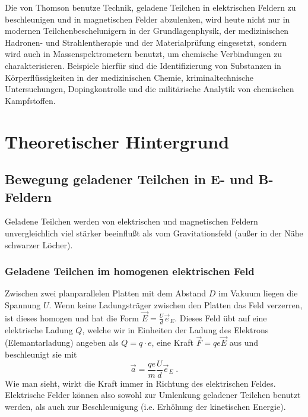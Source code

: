 \noindent
Die von Thomson benutze Technik, geladene Teilchen in elektrischen Feldern zu beschleunigen und in magnetischen Felder abzulenken, wird heute nicht nur in modernen Teilchenbeschelunigern in der Grundlagenphysik, der medizinischen Hadronen- und Strahlentherapie und der Materialprüfung eingesetzt, sondern wird auch in Massenspektrometern benutzt, um chemische Verbindungen zu charakterisieren. Beispiele hierfür sind die Identifizierung von Substanzen in Körperflüssigkeiten in der medizinischen Chemie, kriminaltechnische Untersuchungen, Dopingkontrolle und die militärische Analytik von chemischen Kampfstoffen.

\section{Theoretischer Hintergrund}

\subsection{Bewegung geladener Teilchen in E- und B-Feldern}

Geladene Teilchen werden von elektrischen und magnetischen Feldern unvergleichlich viel stärker beeinflußt als vom Gravitationsfeld (außer in der Nähe schwarzer Löcher). 

\subsubsection*{Geladene Teilchen im homogenen elektrischen Feld}

Zwischen zwei planparallelen Platten mit dem Abstand $D$ im Vakuum liegen die Spannung $U$. Wenn keine Ladungsträger zwischen den Platten das Feld verzerren, ist dieses homogen und hat die Form $\vec{E}=\frac{U}{d}\vec{e}_E$. Dieses Feld übt auf eine elektrische Ladung $Q$, welche wir in Einheiten der Ladung des Elektrons (Elemantarladung) angeben als $Q = q\cdot e$, eine Kraft $\vec{F} = qe\vec{E}$ aus und beschleunigt sie mit
\begin{equation}
	\vec{a} = \frac{qe}{m}\frac{U}{d}\vec{e}_E\; .
\end{equation}
Wie man sieht, wirkt die Kraft immer in Richtung des elektrischen Feldes. Elektrische Felder können also sowohl zur Umlenkung geladener Teilchen benutzt werden, als auch zur Beschleunigung (i.e. Erhöhung der kinetischen Energie).

